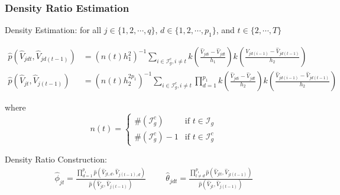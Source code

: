 \documentclass[9pt]{beamer}
\begin{document}
\begin{frame} 
\frametitle{Density Ratio Estimation} 

Density Estimation: for all  $j\in \{1,2,\cdots,q\}$, $d \in \{1,2, \cdots,p_1\}$, and $t \in \{2,\cdots,T\}$

\begin{align*} 
 \hat{p}(\hat{V}_{jdt},\hat{V}_{jd(t-1)}) 
&= (n(t) h_1^2)^{-1}\sum_{  i \in \mathcal{I}_g^c, i\neq t  }k\left( \frac{\hat{V}_{jdi} -\hat{V}_{jdt} }{h_1} \right)k\left( \frac{\hat{V}_{jd(i-1)} -\hat{V}_{jd(t-1)}}{h_2} \right)  \\
%
 \hat{p}(\hat{V}_{jt},\hat{V}_{j(t-1)}) 
&= (n(t)h_2^{2p_1})^{-1}\sum_{ i \in \mathcal{I}_g^c, i\neq t } \prod_{d=1}^{p_1} k\left( \frac{\hat{V}_{jdi} -\hat{V}_{jdt} }{h_2} \right) k\left(\frac{\hat{V}_{jd(i-1)} -\hat{V}_{jd(t-1)} }{h_2} \right) 
\end{align*}

where
$$
n(t)= \begin{cases} \#(\mathcal{I}_g^c)  &\mbox{if } t \in  \mathcal{I}_g \\ 
\#(\mathcal{I}_g^c)-1  &\mbox{if } t \in  \mathcal{I}_g^c \end{cases}
$$

\vspace{0.25cm}

Density Ratio Construction: 
\begin{align*} 
\hat{\phi}_{jt} = \frac{ \prod_{d=1}^{p_1}\hat{p}(\hat{V}_{jt,d},\hat{V}_{j(t-1),d}) }{\hat{p}(\hat{V}_{jt},\hat{V}_{j(t-1)})}
%
\hspace{1cm}
%
\hat{\theta}_{jdt} = \frac{ \prod_{l \neq d}^{p_1}\hat{p}(\hat{V}_{jlt},\hat{V}_{jl(t-1)}) }{\hat{p}(\hat{V}_{jt},\hat{V}_{j(t-1)})}
\end{align*}


\end{frame}
\end{document}
